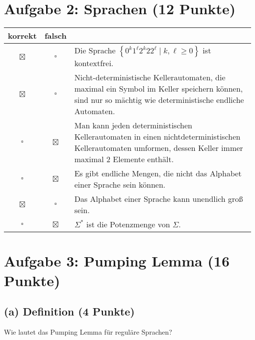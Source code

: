 \documentclass{scrartcl}
\begin{document}
\section*{Aufgabe 2: Sprachen \hfill{} (12 Punkte)}

\newcommand{\mpsol}{\setlength{\fboxsep}{3pt}\colorbox{lightgray!20}{$\boxtimes$}}
\renewcommand{\mp}{\setlength{\fboxsep}{3pt}\colorbox{lightgray!20}{$\square$}}

{\renewcommand{\arraystretch}{1.4}
   \begin{tabularx}{\textwidth}{ccX}
      korrekt & falsch & \\ \hline
      \mpsol & \mp & Die Sprache $\left\{0^k1^\ell2^k22^\ell \mid k,\ell\ge 0\right\}$ ist kontextfrei.\\
      \mpsol & \mp & Nicht-deterministische Kellerautomaten, die maximal ein Symbol im Keller
      speichern können, sind nur so mächtig wie deterministische
      endliche Automaten. \\
      \mp & \mpsol & Man kann jeden deterministischen Kellerautomaten in einen
      nichtdeterministischen Kellerautomaten umformen, dessen Keller immer maximal 2
      Elemente enthält.\\
      \mp & \mpsol & Es gibt endliche Mengen, die nicht das Alphabet einer Sprache
      sein können. \\
      \mpsol & \mp & Das Alphabet einer Sprache kann unendlich groß sein.\\
      \mp & \mpsol & $\Sigma^*$ ist die Potenzmenge von $\Sigma$.
\end{tabularx}}

\pagebreak
\section*{Aufgabe 3: Pumping Lemma \hfill (16 Punkte)}
\subsection*{(a) Definition \hfill \normalfont (4 Punkte)}
Wie lautet das Pumping Lemma für reguläre Sprachen?

\vspace{4pt}
\noindent{}
\end{document}
